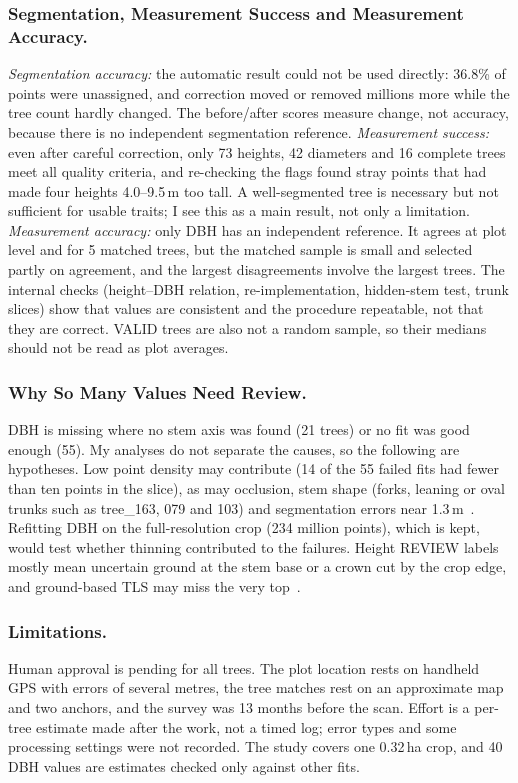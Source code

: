 \documentclass[runningheads]{llncs}
\begin{document}
\subsubsection{Segmentation, Measurement Success and Measurement Accuracy.}
\emph{Segmentation accuracy:} the automatic result could not be used directly: 36.8\% of points were unassigned, and correction moved or removed millions more while the tree count hardly changed. The before/after scores measure change, not accuracy, because there is no independent segmentation reference. \emph{Measurement success:} even after careful correction, only 73 heights, 42 diameters and 16 complete trees meet all quality criteria, and re-checking the flags found stray points that had made four heights 4.0--9.5\,m too tall. A well-segmented tree is necessary but not sufficient for usable traits; I see this as a main result, not only a limitation. \emph{Measurement accuracy:} only DBH has an independent reference. It agrees at plot level and for 5 matched trees, but the matched sample is small and selected partly on agreement, and the largest disagreements involve the largest trees. The internal checks (height--DBH relation, re-implementation, hidden-stem test, trunk slices) show that values are consistent and the procedure repeatable, not that they are correct. VALID trees are also not a random sample, so their medians should not be read as plot averages.

\subsubsection{Why So Many Values Need Review.}
DBH is missing where no stem axis was found (21 trees) or no fit was good enough (55). My analyses do not separate the causes, so the following are hypotheses. Low point density may contribute (14 of the 55 failed fits had fewer than ten points in the slice), as may occlusion, stem shape (forks, leaning or oval trunks such as tree\_163, 079 and 103) and segmentation errors near 1.3\,m~\cite{calders2020,cushman2026}. Refitting DBH on the full-resolution crop (234 million points), which is kept, would test whether thinning contributed to the failures. Height REVIEW labels mostly mean uncertain ground at the stem base or a crown cut by the crop edge, and ground-based TLS may miss the very top~\cite{calders2020,cushman2026}.
\subsubsection{Limitations.}
Human approval is pending for all trees. The plot location rests on handheld GPS with errors of several metres, the tree matches rest on an approximate map and two anchors, and the survey was 13 months before the scan. Effort is a per-tree estimate made after the work, not a timed log; error types and some processing settings were not recorded. The study covers one 0.32\,ha crop, and 40 DBH values are estimates checked only against other fits.
\end{document}
